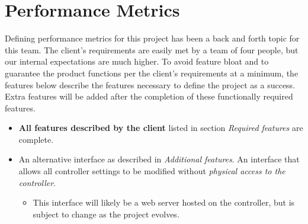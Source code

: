 	\section*{Performance Metrics}
	Defining performance metrics for this project has been a back and forth topic for this team. The client's requirements are easily met by a team of four people, but our internal expectations are much higher. To avoid feature bloat and to guarantee the product functions per the client's requirements at a minimum, the features below describe the features necessary to define the project as a success. Extra features will be added after the completion of these functionally required features.
	\begin{itemize}
		\item \textbf{All features described by the client} listed in section \textit{Required features} are complete.
		\item An alternative interface as described in \textit{Additional features}. An interface that allows all controller settings to be modified without \textit{physical access to the controller}.
		\begin{itemize}
			\item This interface will likely be a web server hosted on the controller, but is subject to change as the project evolves.
		\end{itemize}
	\end{itemize}
